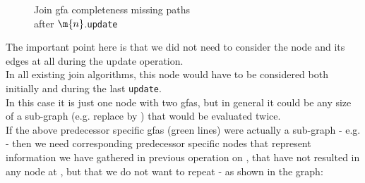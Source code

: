 \begin{figure}[H]
\caption{
Join gfa completeness missing paths\\
after $\m{n}$.\lstinline{update}
}
\label{snippet3.22_graph5}
\end{figure}
The important point here is that we did not need to consider the node  and its edges at all during the update operation.\\
In all existing join algorithms, this node would have to be considered both initially and during the last \lstinline{update}.\\
In this case it is just one node with two gfas, but in general it could be any size of a sub-graph (e.g. replace  by  ) that would be evaluated twice.\\
If the above predecessor specific gfas (green lines) were actually a sub-graph - e.g.  - then we need corresponding 
predecessor specific nodes that represent information we have gathered in previous operation on , that have not resulted in any node
at , but that we do not want to repeat - as shown in the graph:

